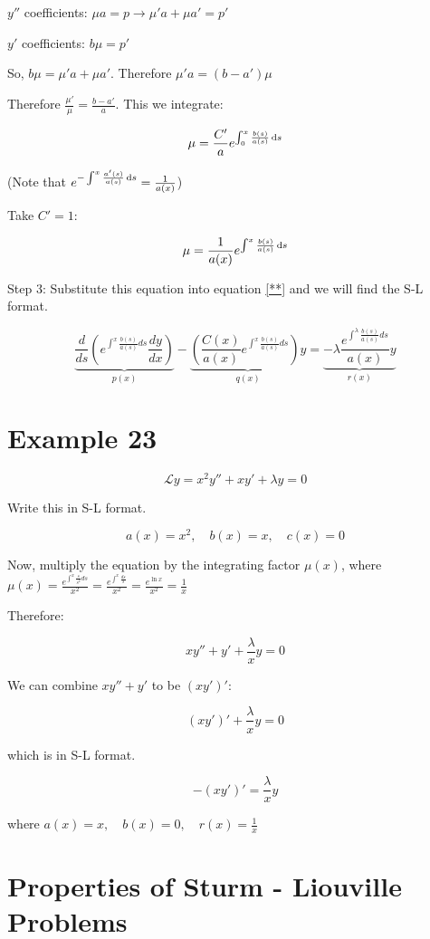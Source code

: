 \documentclass{article}
\begin{document}
$y''$ coefficients: $\mu a = p \to \mu' a + \mu a' = p'$

$y'$ coefficients: $b \mu = p'$

So, $b \mu = \mu' a + \mu a'$. Therefore $\mu' a = (b -a') \mu$

Therefore $\frac{\mu'}{\mu} = \frac{b-a'}{a}$. This we integrate:

$$\mu = \frac{C'}{a} e^{\int_0^x \frac{b(s)}{a(s)} \,\mathrm{d} s}$$

(Note that $e^{- \int^x \frac{a'(s)}{a(s)} \,\mathrm{d} s} = \frac{1}{a(x)}$)

Take $C' = 1$:

$$\mu = \frac{1}{a(x)} e^{\int^x \frac{b(s)}{a(s)} \,\mathrm{d} s}$$

Step 3: Substitute this equation into equation \ref{**} and we will find the S-L format. 


$$\underbrace{\frac{d}{ds} \left( e^{\int^x \frac{b(s)}{a(s)} ds} \frac{dy}{dx} \right)}_{p(x)} - \underbrace{\left( \frac{C(x)}{a(x)} e^{\int^x \frac{b(s)}{a(s)} ds} \right) y}_{q(x)} = \underbrace{- \lambda \frac{e^{\int^\lambda \frac{b(s)}{a(s)} ds}}{a(x)} y}_{r(x)}$$

\section{Example 23}

$$\mathcal{L} y = x^2 y'' + xy' + \lambda y = 0$$

Write this in S-L format. 

$$a(x) =  x^2, \quad b(x) = x, \quad c(x) = 0$$

Now, multiply the equation by the integrating factor $\mu(x)$, where $\mu(x) = \frac{e^{\int^x \frac{s}{s^2} ds}}{x^2} = \frac{e^{\int^x \frac{ds}{s}}}{x^2} = \frac{e^{\ln x}}{x^2} =  \frac{1}{x}$

Therefore:

$$x y'' + y' + \frac{\lambda}{x} y = 0$$

We can combine $x y'' + y'$ to be $(x y')'$:

$$(x y')' + \frac{\lambda}{x} y = 0$$

which is in S-L format. 

$$- (x y')' = \frac{\lambda}{x} y$$

where $a(x) = x, \quad b(x) = 0, \quad r(x) = \frac{1}{x}$

\section{Properties of Sturm - Liouville Problems}
\end{document}
